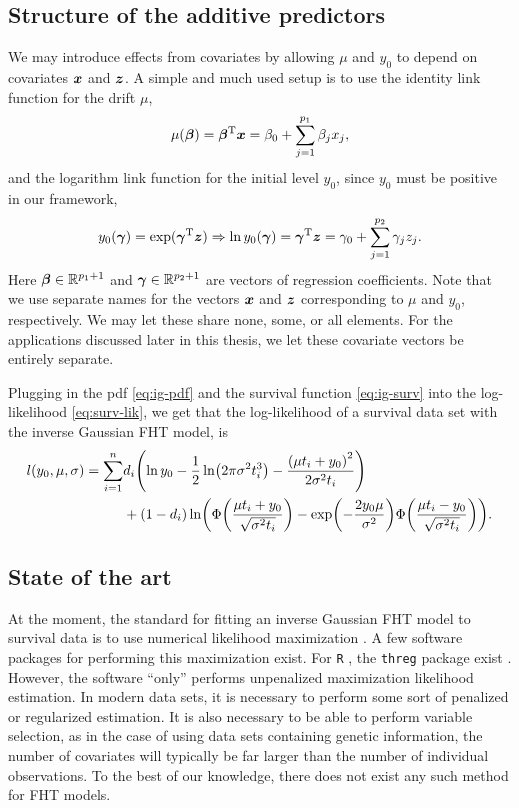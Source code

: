 \subsection{Structure of the additive predictors}
\label{subsec:IG-reg}
We may introduce effects from covariates by allowing $\mu$ and $y_0$ to depend on covariates $\bm{x}$ and $\bm{z}$.
A simple and much used setup \citep{leewhitmore2006, caroni2017} is to use the identity link function for the drift $\mu$,
\begin{equation}\label{eq:y0}
    \mu(\boldsymbol{\beta})=\boldsymbol{\beta}^{\text{T}}\bm{x}=\beta_0+\sum_{j=1}^{p_1} \beta_jx_j,
\end{equation}
and the logarithm link function for the initial level $y_0$, since $y_0$ must be positive in our framework,
\begin{equation}\label{eq:mu}
    y_0(\boldsymbol{\gamma})=\exp(\boldsymbol{\gamma}^{\text{T}}\bm{z})\Rightarrow\ln y_0(\boldsymbol{\gamma})=\boldsymbol{\gamma}^{\text{T}}\bm{z}=\gamma_0+\sum_{j=1}^{p_2} \gamma_jz_j.
\end{equation}
Here $\boldsymbol{\beta}\in\mathbb{R}^{p_1+1}$ and $\boldsymbol{\gamma}\in\mathbb{R}^{p_2+1}$ are vectors of regression coefficients.
Note that we use separate names for the vectors $\bm{x}$ and $\bm{z}$ corresponding to $\mu$ and $y_0$, respectively.
We may let these share none, some, or all elements.
For the applications discussed later in this thesis, we let these covariate vectors be entirely separate.

Plugging in the pdf \eqref{eq:ig-pdf} and the survival function \eqref{eq:ig-surv} into the log-likelihood \eqref{eq:surv-lik}, we get that the log-likelihood of a survival data set with the inverse Gaussian FHT model, is
\begin{align}\label{eq:loglik}
\begin{split}
    l(y_0,\mu,\sigma)=\sum_{i=1}^n&d_i\p*{\ln y_0-\frac{1}{2}\ln\p*{2\pi\sigma^2\ti^3}-\frac{\p*{\mu\ti+y_0}^2}{2\sigma^2\ti}} \\
    &+
    (1-d_i)\ln\p*{\Phi\p*{\frac{\mu\ti+y_0}{\sqrt{\sigma^2\ti}}}-\exp\p*{-\frac{2y_0\mu}{\sigma^2}}\Phi\p*{\frac{\mu\ti-y_0}{\sqrt{\sigma^2\ti}}}}.
\end{split}
\end{align}

\subsection{State of the art}
At the moment, the standard for fitting an inverse Gaussian FHT model to survival data is to use numerical likelihood maximization \citep{caroni2017}.
A few software packages for performing this maximization exist.
For \verb|R| \citep{Rlang}, the \verb|threg| package exist \citep{threg}.
However, the software ``only'' performs unpenalized maximization likelihood estimation.
In modern data sets, it is necessary to perform some sort of penalized or regularized estimation.
It is also necessary to be able to perform variable selection, as in the case of using data sets containing genetic information, the number of covariates will typically be far larger than the number of individual observations.
To the best of our knowledge, there does not exist any such method for FHT models.

